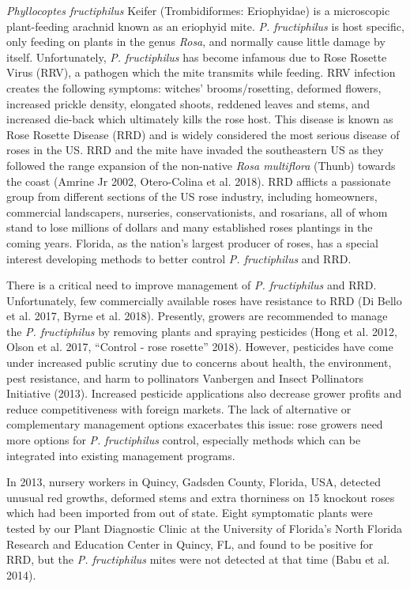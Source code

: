 \documentclass[12pt,final,CPage]{ufthesis}
\begin{document}
{  \emph{Phyllocoptes fructiphilus} Keifer (Trombidiformes: Eriophyidae) is a microscopic plant-feeding arachnid known as an eriophyid mite. \emph{P. fructiphilus} is host specific, only feeding on plants in the genus \emph{Rosa}, and normally cause little damage by itself. Unfortunately, \emph{P. fructiphilus} has become infamous due to Rose Rosette Virus (RRV), a pathogen which the mite transmits while feeding. RRV infection creates the following symptoms: witches' brooms/rosetting, deformed flowers, increased prickle density, elongated shoots, reddened leaves and stems, and increased die-back which ultimately kills the rose host. This disease is known as Rose Rosette Disease (RRD) and is widely considered the most serious disease of roses in the US. RRD and the mite have invaded the southeastern US as they followed the range expansion of the non-native \emph{Rosa multiflora} (Thunb) towards the coast (Amrine Jr 2002, Otero-Colina et al. 2018). RRD afflicts a passionate group from different sections of the US rose industry, including homeowners, commercial landscapers, nurseries, conservationists, and rosarians, all of whom stand to lose millions of dollars and many established roses plantings in the coming years. Florida, as the nation's largest producer of roses, has a special interest developing methods to better control \emph{P. fructiphilus} and RRD.

  There is a critical need to improve management of \emph{P. fructiphilus} and RRD. Unfortunately, few commercially available roses have resistance to RRD (Di Bello et al. 2017, Byrne et al. 2018). Presently, growers are recommended to manage the \emph{P. fructiphilus} by removing plants and spraying pesticides (Hong et al. 2012, Olson et al. 2017, {``Control - rose rosette''} 2018). However, pesticides have come under increased public scrutiny due to concerns about health, the environment, pest resistance, and harm to pollinators Vanbergen and Insect Pollinators Initiative (2013). Increased pesticide applications also decrease grower profits and reduce competitiveness with foreign markets. The lack of alternative or complementary management options exacerbates this issue: rose growers need more options for \emph{P. fructiphilus} control, especially methods which can be integrated into existing management programs.

  In 2013, nursery workers in Quincy, Gadsden County, Florida, USA, detected unusual red growths, deformed stems and extra thorniness on 15 knockout roses which had been imported from out of state. Eight symptomatic plants were tested by our Plant Diagnostic Clinic at the University of Florida's North Florida Research and Education Center in Quincy, FL, and found to be positive for RRD, but the \emph{P. fructiphilus} mites were not detected at that time (Babu et al. 2014).

}
\end{document}
